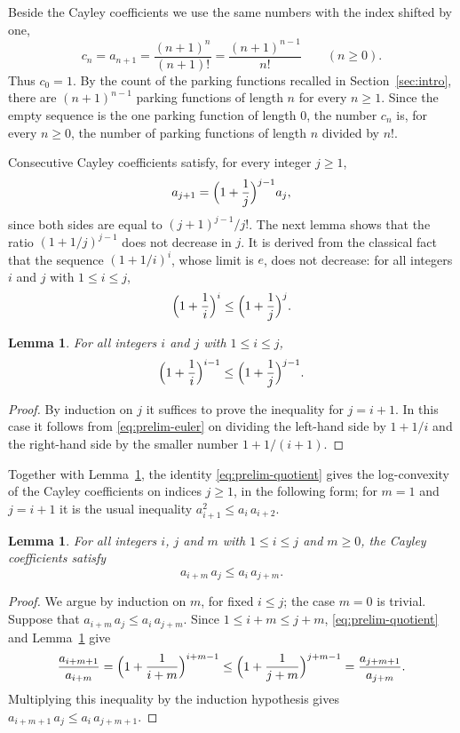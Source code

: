 \documentclass{amsart}
\newtheorem{lemma}[theorem]{Lemma}
\theoremstyle{definition}
\theoremstyle{remark}
\numberwithin{equation}{section}
\begin{document}
Beside the Cayley coefficients we use the same numbers with the index shifted
by one,
\[
c_n=a_{n+1}=\frac{(n+1)^{n}}{(n+1)!}=\frac{(n+1)^{n-1}}{n!}\qquad(n\ge0).
\]
Thus $c_0=1$. By the count of the parking functions recalled in
Section~\ref{sec:intro}, there are $(n+1)^{n-1}$ parking functions of
length $n$ for every $n\ge1$. Since the empty sequence is
the one parking function of length $0$, the number $c_n$ is, for every
$n\ge0$, the number of parking functions of length $n$ divided by $n!$.

Consecutive Cayley coefficients satisfy, for every integer $j\ge1$,
\begin{equation}\label{eq:prelim-quotient}
a_{j+1}=\Bigl(1+\frac1j\Bigr)^{j-1}a_j,
\end{equation}
since both sides are equal to $(j+1)^{j-1}/j!$. The next lemma shows that
the ratio $(1+1/j)^{j-1}$ does not decrease in $j$. It is derived from the
classical fact
that the sequence $(1+1/i)^{i}$, whose limit is $e$, does not decrease: for
all integers $i$ and $j$ with $1\le i\le j$,
\begin{equation}\label{eq:prelim-euler}
\Bigl(1+\frac1i\Bigr)^{i}\le\Bigl(1+\frac1j\Bigr)^{j}.
\end{equation}

\begin{lemma}\label{lem:powermonotone}
For all integers $i$ and $j$ with $1\le i\le j$,
\[
\Bigl(1+\frac1i\Bigr)^{i-1}\le\Bigl(1+\frac1j\Bigr)^{j-1}.
\]
\end{lemma}

\begin{proof}
By induction on $j$ it suffices to prove the inequality for $j=i+1$. In this
case it follows from \eqref{eq:prelim-euler} on dividing the left-hand side
by $1+1/i$ and the right-hand side by the smaller number $1+1/(i+1)$.
\end{proof}

Together with Lemma~\ref{lem:powermonotone}, the identity
\eqref{eq:prelim-quotient} gives the
log-convexity of the Cayley coefficients on indices $j\ge1$, in the
following form; for $m=1$ and $j=i+1$ it is the usual inequality
$a_{i+1}^2\le a_i\,a_{i+2}$.

\begin{lemma}\label{lem:cayleyconvex}
For all integers $i$, $j$ and $m$ with $1\le i\le j$ and $m\ge0$, the Cayley
coefficients satisfy
\[
a_{i+m}\,a_j\le a_i\,a_{j+m}.
\]
\end{lemma}

\begin{proof}
We argue by induction on $m$, for fixed $i\le j$; the case $m=0$ is trivial.
Suppose that $a_{i+m}\,a_j\le a_i\,a_{j+m}$. Since $1\le i+m\le j+m$,
\eqref{eq:prelim-quotient} and Lemma~\ref{lem:powermonotone} give
\[
\frac{a_{i+m+1}}{a_{i+m}}=\Bigl(1+\frac1{i+m}\Bigr)^{i+m-1}
\le\Bigl(1+\frac1{j+m}\Bigr)^{j+m-1}=\frac{a_{j+m+1}}{a_{j+m}}.
\]
Multiplying this inequality by the induction hypothesis gives
$a_{i+m+1}\,a_j\le a_i\,a_{j+m+1}$.
\end{proof}
\end{document}
